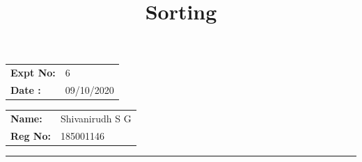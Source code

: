 \documentclass[10pt,a4paper]{article}
\title{\bf Sorting}
\author{\vspace{-10ex}}
\date{\vspace{-10ex}}
\begin{document}
\maketitle

\begin{minipage}{0.45\textwidth}
        \begin{tabular}{l l}
            \textbf{Expt No:}&6\\
            \textbf{Date :}&09/10/2020
        \end{tabular}
\end{minipage}%
\begin{minipage}{0.45\textwidth}
        \begin{tabular}{l l}
             \textbf{Name:}& Shivanirudh S G  \\
             \textbf{Reg No:} & 185001146 
        \end{tabular}
\end{minipage}
\vspace{1cm}
\hrule
\end{document}
